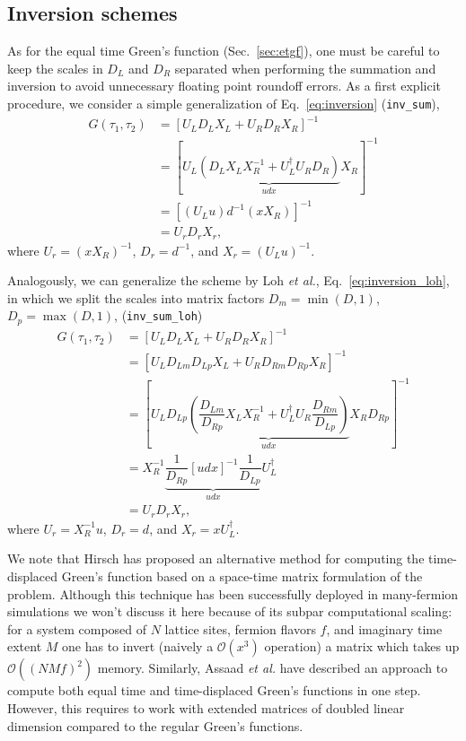 \documentclass[submission, Phys]{SciPost}
\begin{document}
\subsection{Inversion schemes}
As for the equal time Green's function (Sec.~\ref{sec:etgf}), one must be careful to keep the scales in $D_L$ and $D_R$ separated when performing the summation and inversion to avoid unnecessary floating point roundoff errors.
As a first explicit procedure, we consider a simple generalization of Eq.~\ref{eq:inversion} (\texttt{inv\_sum}),
\begin{align}
	G(\tau_1, \tau_2) &= [U_L D_L X_L + U_R D_R X_R]^{-1} \nonumber\\
	&= [U_L \underbrace{(D_L X_L X_R^{-1} + U_L^\dagger U_R D_R)}_{udx} X_R ]^{-1} \nonumber\\
	&= [(U_L u) d^{-1} (x X_R)]^{-1} \label{eq:inversion_tdgf}\\
	&= U_r D_r X_r, \nonumber 
\end{align}
where $U_r = (x X_R)^{-1}$, $D_r = d^{-1}$, and $X_r = (U_L u)^{-1}$.

Analogously, we can generalize the scheme by Loh \textit{et al.}\cite{Loh2005}, Eq.~\ref{eq:inversion_loh}, in which we split the scales into matrix factors $D_m = \min(D, 1)$, $D_p = \max(D, 1)$, (\texttt{inv\_sum\_loh})
\begin{align}
	G(\tau_1, \tau_2) &= [U_L D_L X_L + U_R D_R X_R]^{-1} \nonumber\\
	&= [U_L D_{Lm} D_{Lp} X_L + U_R D_{Rm} D_{Rp} X_R]^{-1} \nonumber\\
	&= \left[U_L D_{Lp} \underbrace{\left( \dfrac{D_{Lm}}{D_{Rp}} X_L X_R^{-1} + U_L^\dagger U_R \dfrac{D_{Rm}}{D_{Lp}} \right)}_{udx} X_R D_{Rp} \right]^{-1} \nonumber\\
	&= X_R^{-1} \underbrace{\dfrac{1}{D_{Rp}} [udx]^{-1} \dfrac{1}{D_{Lp}}}_{udx} U_L^\dagger \label{eq:inversion_tdgf_loh} \\
	&= U_r D_r X_r, \nonumber
\end{align}
where $U_r = X_R^{-1} u$, $D_r = d$, and $X_r = x U_L^\dagger$.

We note that Hirsch\cite{Hirsch1988, Santos2003} has proposed an alternative method for computing the time-displaced Green's function based on a space-time matrix formulation of the problem. Although this technique has been successfully deployed in many-fermion simulations we won't discuss it here because of its subpar computational scaling: for a system composed of $N$ lattice sites, fermion flavors $f$, and imaginary time extent $M$ one has to invert (naively a $\mathcal{O}(x^3)$ operation) a matrix which takes up $\mathcal{O}((NMf)^2)$ memory. Similarly, Assaad \textit{et al.}\cite{Assaad2002a} have described an approach to compute both equal time and time-displaced Green's functions in one step. However, this requires to work with extended matrices of doubled linear dimension compared to the regular Green's functions.
\end{document}
